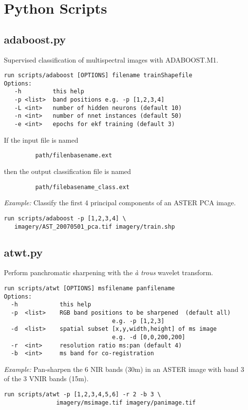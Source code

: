 \documentclass{paper}
\begin{document}
\section*{Python Scripts}


\subsection*{adaboost.py}
Supervised classification of multispectral images with ADABOOST.M1.
\begin{verbatim}
run scripts/adaboost [OPTIONS] filename trainShapefile    
Options:
   -h         this help
   -p <list>  band positions e.g. -p [1,2,3,4] 
   -L <int>   number of hidden neurons (default 10)
   -n <int>   number of nnet instances (default 50)
   -e <int>   epochs for ekf training (default 3)
\end{verbatim}
If the input file is named 
\begin{lstlisting}
         path/filenbasename.ext 
\end{lstlisting}
then the output classification file is named 
\begin{lstlisting}
         path/filebasename_class.ext
\end{lstlisting}
{\it Example:} Classify the first 4 principal components of an ASTER PCA image.
 \begin{lstlisting}
run scripts/adaboost -p [1,2,3,4] \
   imagery/AST_20070501_pca.tif imagery/train.shp
\end{lstlisting}


\subsection*{atwt.py}
Perform panchromatic sharpening with the {\it \`a trous} wavelet transform.
\begin{verbatim}
run scripts/atwt [OPTIONS] msfilename panfilename
Options:
  -h            this help
  -p  <list>    RGB band positions to be sharpened  (default all)
                               e.g. -p [1,2,3]
  -d  <list>    spatial subset [x,y,width,height] of ms image
                               e.g. -d [0,0,200,200]
  -r  <int>     resolution ratio ms:pan (default 4)
  -b  <int>     ms band for co-registration
\end{verbatim}
{\it Example:} Pan-sharpen the 6 NIR bands (30m) in an ASTER image with band 3 of the 3 VNIR bands (15m).
\begin{lstlisting}
run scripts/atwt -p [1,2,3,4,5,6] -r 2 -b 3 \
               imagery/msimage.tif imagery/panimage.tif
\end{lstlisting}
\end{document}
